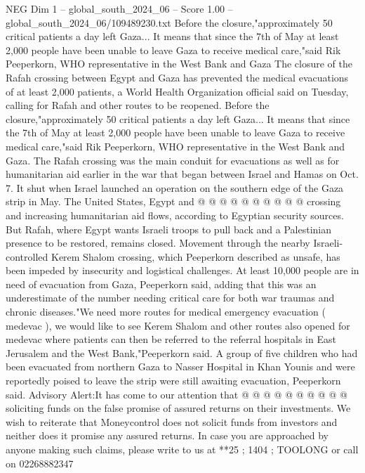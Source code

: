 \begin{textsample}{NEG Dim 1 – global\_south\_2024\_06 – Score 1.00 – global\_south\_2024\_06/109489230.txt}  \label{ex:f1_neg_323}
Before the closure,"approximately 50 critical patients a day left Gaza...
It means that since the 7th of May at least 2,000 people have been unable to leave Gaza to receive medical care,"said Rik Peeperkorn, WHO representative in the West Bank and Gaza The closure of the Rafah crossing between Egypt and Gaza has prevented the medical evacuations of at least 2,000 patients, a World Health Organization official said on Tuesday, calling for Rafah and other routes to be reopened.
Before the closure,"approximately 50 critical patients a day left Gaza...
It means that since the 7th of May at least 2,000 people have been unable to leave Gaza to receive medical care,"said Rik Peeperkorn, WHO representative in the West Bank and Gaza.
The Rafah crossing was the main conduit for evacuations as well as for humanitarian aid earlier in the war that began between Israel and Hamas on Oct. 7.
It shut when Israel launched an operation on the southern edge of the Gaza strip in May.
The United States, Egypt and @ @ @ @ @ @ @ @ @ @ crossing and increasing humanitarian aid flows, according to Egyptian security sources.
But Rafah, where Egypt wants Israeli troops to pull back and a Palestinian presence to be restored, remains closed.
Movement through the nearby Israeli-controlled Kerem Shalom crossing, which Peeperkorn described as unsafe, has been impeded by insecurity and logistical challenges.
At least 10,000 people are in need of evacuation from Gaza, Peeperkorn said, adding that this was an underestimate of the number needing critical care for both war traumas and chronic diseases."We need more routes for medical emergency evacuation ( medevac ), we would like to see Kerem Shalom and other routes also opened for medevac where patients can then be referred to the referral hospitals in East Jerusalem and the West Bank,"Peeperkorn said.
A group of five children who had been evacuated from northern Gaza to Nasser Hospital in Khan Younis and were reportedly poised to leave the strip were still awaiting evacuation, Peeperkorn said.
Advisory Alert:It has come to our attention that @ @ @ @ @ @ @ @ @ @ soliciting funds on the false promise of assured returns on their investments.
We wish to reiterate that Moneycontrol does not solicit funds from investors and neither does it promise any assured returns.
In case you are approached by anyone making such claims, please write to us at **25 ; 1404 ; TOOLONG or call on 02268882347

\end{textsample}
